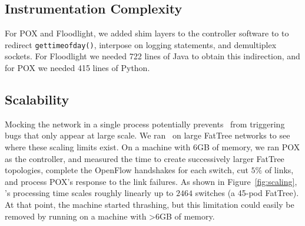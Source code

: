 \subsection{Instrumentation Complexity}

For POX and Floodlight, we added shim layers to the controller software to
to redirect {\tt gettimeofday()}, interpose on logging
statements, and demultiplex sockets. For Floodlight we needed 722 lines of Java to obtain this
indirection, and for POX we needed 415 lines of Python.



\subsection{Scalability}
Mocking the network in a single process potentially prevents \projectname~from
triggering bugs that only appear at large scale. We ran
\projectname~on large FatTree networks to see where these scaling limits exist.
On a machine with 6GB of memory, we ran POX as the controller, and measured the
time to create successively larger FatTree
topologies, complete the OpenFlow handshakes for each switch,
cut $5\%$ of links, and process POX's response to the link failures. As shown in
Figure~\ref{fig:scaling}, \projectname's processing time scales roughly
linearly up to $2464$ switches (a 45-pod FatTree). At that point, the machine
started thrashing, but this limitation could easily be removed by running on a
machine with >6GB of memory.

